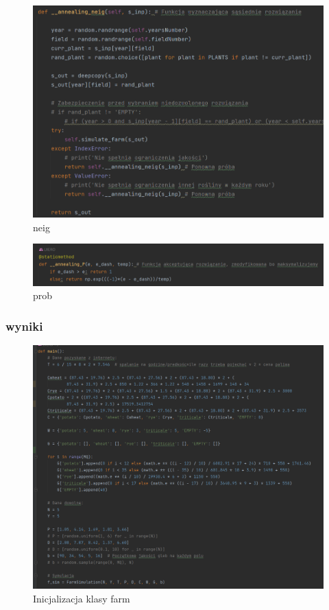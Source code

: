 \documentclass[12pt,a4paper]{article}
\begin{document}
\begin{figure}[H]
	\centering
	\includegraphics[width=1\linewidth]{screens/anealing_neig}
	\caption{neig}
	\label{fig:anealingneig}
\end{figure}



\begin{figure}[H]
	\centering
	\includegraphics[width=1\linewidth]{screens/anealing_Prob}
	\caption{prob}
	\label{fig:anealingprob}
\end{figure}

\subsubsection{wyniki}

\begin{figure}[H]
	\centering
	\includegraphics[width=1\linewidth]{screens/main1}
	\caption{Inicjalizacja klasy farm}
	\label{fig:main1}
\end{figure}
\end{document}
